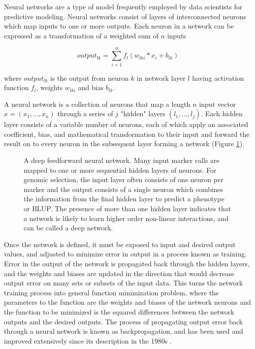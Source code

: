 Neural networks are a type of model frequently employed by data scientists
for predictive modeling. Neural networks consist of layers of interconnected neurons
which map inputs to one or more outputs. Each neuron in a network can be expressed as a 
transformation of a weighted sum of $n$ inputs 

\begin{equation}
output_{lk} = \sum_{i=1}^{n} f_l(w_{lki} * x_{i} + b_{lk})
\label{eq:neuron}
\end{equation}

where $output_{lk}$ is the output from neuron $k$ in network layer $l$ having activation
function $f_l$, weights $w_{lki}$ and bias $b_{lk}$.

A neural network is a collection of neurons that map a 
length $n$ input vector $x = (x_1, ..., x_n)$ through a series of $j$ 
"hidden" layers $(l_1, ..., l_j)$. Each hidden layer consists of a variable 
number of neurons, each of which apply an associated coefficient, bias, and 
mathematical transformation to their input and forward the 
result on to every neuron in the subsequent layer forming a network (Figure \ref{fig:deepnet}).

\begin{figure}[htbp]
\renewcommand{\familydefault}{\sfdefault}\normalfont
\centering

\caption{A deep feedforward neural network. Many input marker calls are mapped 
to one or more sequential hidden layers of neurons. For genomic selection, the
input layer often consists of one neuron per marker and the output consists of a single
neuron which combines the information from the final hidden layer to predict a phenotype or BLUP.
The presence of more than one hidden layer indicates that a network is likely to learn
higher order non-linear interactions, and can be called a deep network.}
\label{fig:deepnet}
\end{figure}

Once the network is defined, it must be exposed to input and desired output
values, and adjusted to minimize error in output in a process known as training.
Error in the output of the network is propagated back through the hidden 
layers, and the weights and biases are updated in the direction that would 
decrease output error on many sets or subsets of the input data. 
This turns the network training process into general 
function minimization problem, where the parameters to the function are the 
weights and biases of the network neurons and the function to be 
minimized is the squared differences between the network outputs and 
the desired outputs. The process of propagating output error back 
through a neural network is known as backpropagation, and has been used 
and improved extensively since its description in the 1980s \citep{rumelhart1986}. 


